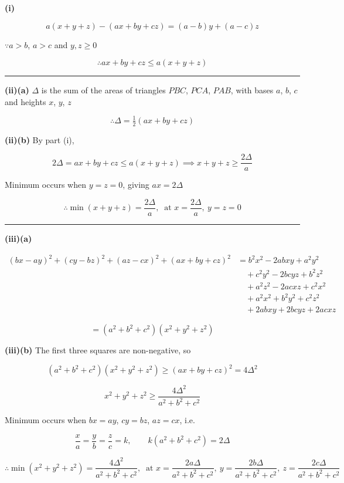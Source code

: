 \documentclass[12pt]{article}
\begin{document}
\newcommand{\ds}{\displaystyle}

\textbf{(i)}

$$a(x+y+z)-(ax+by+cz)=(a-b)y+(a-c)z$$

$\because a>b$, $a>c$ and $y,z\geq0$

$$\therefore \boxed{ax+by+cz\leq a(x+y+z)}$$

\bigskip\hrule\bigskip

\textbf{(ii)(a)} $\Delta$ is the sum of the areas of triangles $PBC$, $PCA$, $PAB$, with bases $a$, $b$, $c$ and heights $x$, $y$, $z$

$$\therefore \boxed{\Delta=\tfrac12\left(ax+by+cz\right)}$$

\bigskip

\textbf{(ii)(b)} By part (i),

$$2\Delta=ax+by+cz\leq a(x+y+z)\implies x+y+z\geq\frac{2\Delta}{a}$$

Minimum occurs when $y=z=0$, giving $ax=2\Delta$

$$\therefore \boxed{\min(x+y+z)=\frac{2\Delta}{a},\ \text{ at }x=\frac{2\Delta}{a},\ y=z=0}$$

\bigskip\hrule\bigskip

\textbf{(iii)(a)}

\begin{align*}
(bx-ay)^2+(cy-bz)^2+(az-cx)^2+(ax+by+cz)^2
&=b^2x^2-2abxy+a^2y^2\\
&\quad+c^2y^2-2bcyz+b^2z^2\\
&\quad+a^2z^2-2acxz+c^2x^2\\
&\quad+a^2x^2+b^2y^2+c^2z^2\\
&\quad+2abxy+2bcyz+2acxz
\end{align*}

$$=\left(a^2+b^2+c^2\right)\left(x^2+y^2+z^2\right)$$

\bigskip

\textbf{(iii)(b)} The first three squares are non-negative, so

$$\left(a^2+b^2+c^2\right)\left(x^2+y^2+z^2\right)\geq(ax+by+cz)^2=4\Delta^2$$

$$x^2+y^2+z^2\geq\frac{4\Delta^2}{a^2+b^2+c^2}$$

Minimum occurs when $bx=ay$, $cy=bz$, $az=cx$, i.e.

$$\frac xa=\frac yb=\frac zc=k,\qquad k\left(a^2+b^2+c^2\right)=2\Delta$$

$$\therefore \boxed{\min\left(x^2+y^2+z^2\right)=\frac{4\Delta^2}{a^2+b^2+c^2},\ \text{ at }x=\frac{2a\Delta}{a^2+b^2+c^2},\ y=\frac{2b\Delta}{a^2+b^2+c^2},\ z=\frac{2c\Delta}{a^2+b^2+c^2}}$$
\end{document}
